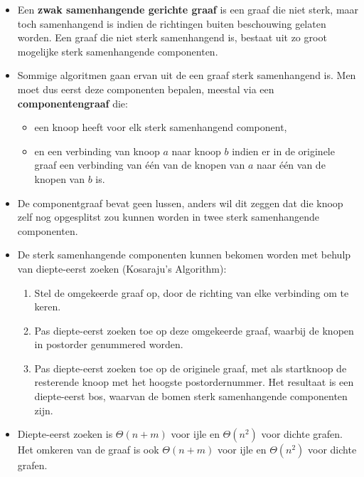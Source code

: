 \documentclass{report}
\begin{document}
\begin{itemize}
	\item[\info] Een \textbf{zwak samenhangende gerichte graaf} is een graaf die niet sterk, maar toch samenhangend is indien de richtingen buiten beschouwing gelaten worden. Een graaf die niet sterk samenhangend is, bestaat uit zo groot mogelijke sterk samenhangende componenten. 
	\item[\info] Sommige algoritmen gaan ervan uit de een graaf sterk samenhangend is. Men moet dus eerst deze componenten bepalen, meestal via een \textbf{componentengraaf} die:
	\begin{itemize}
		\item[\info] een knoop heeft voor elk sterk samenhangend component,
		\item[\info] en een verbinding van knoop $a$ naar knoop $b$ indien er in de originele graaf een verbinding van één van de knopen van $a$ naar één van de knopen van $b$ is. 
	\end{itemize}
	\item[\alert] De componentgraaf bevat geen lussen, anders wil dit zeggen dat die knoop zelf nog opgesplitst zou kunnen worden in twee sterk samenhangende componenten.
	\item[\info] De sterk samenhangende componenten kunnen bekomen worden met behulp van diepte-eerst zoeken (Kosaraju's Algorithm):
	\begin{enumerate}
		\item Stel de omgekeerde graaf op, door de richting van elke verbinding om te keren.
		\item Pas diepte-eerst zoeken toe op deze omgekeerde graaf, waarbij de knopen in postorder genummered worden.
		\item Pas diepte-eerst zoeken toe op de originele graaf, met als startknoop de resterende knoop met het hoogste postordernummer. Het resultaat is een diepte-eerst bos, waarvan de bomen sterk samenhangende componenten zijn.
	\end{enumerate}
	\item[\info] Diepte-eerst zoeken is $\Theta(n + m)$ voor ijle en $\Theta(n^2)$ voor dichte grafen. Het omkeren van de graaf is ook $\Theta(n + m)$ voor ijle en $\Theta(n^2)$ voor dichte grafen.
\end{itemize}
\end{document}
